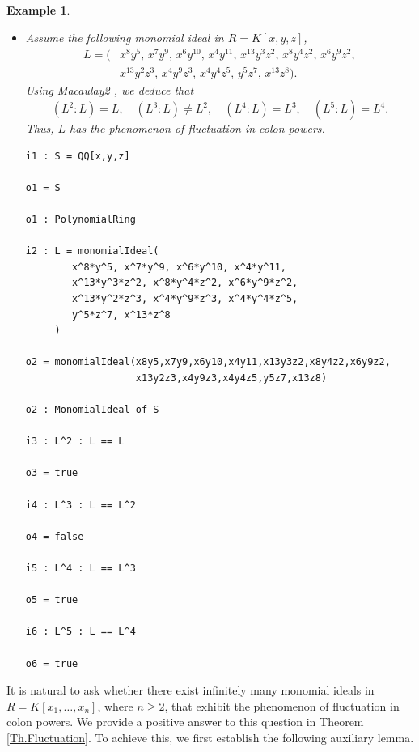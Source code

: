 \documentclass[11pt]{amsart}
\newtheorem{example}[theorem]{Example}
\begin{document}
\begin{example}
{\begin{itemize}
\begin{verbatim}
i6 : J^5 : J == J^4

o6 = true
\end{verbatim}
 
\item[(iii)]  Assume  the following monomial ideal in $R=K[x,y,z]$, 
\begin{align*}
L=(&x^{8}y^{5},\,x^{7}y^{9},\,x^{6}y^{10},\,x^{4}y^{11},\,x^{13}y^{3}z^{2},\,x^{8}y^{4}z^{2},\,x^{6}y^{9}z^{2},\\
& x^{13}y^{2}z^{3},\,x^{4}y^{9}z^{3},\,x^{4}y^{4}z^{5},\,y^{5}z^{7},\,x^{13}z^{8}).
\end{align*}
 Using  \textit{Macaulay2} \cite{GS}, we deduce that 
$$(L^2 : L) = L,\quad (L^3 : L) \neq L^2,  \quad  (L^4 : L) = L^3, \quad  (L^5: L) = L^4.$$
Thus, $L$ has the  phenomenon  of  fluctuation in colon powers.
\begin{verbatim}
i1 : S = QQ[x,y,z]

o1 = S

o1 : PolynomialRing

i2 : L = monomialIdeal(
        x^8*y^5, x^7*y^9, x^6*y^10, x^4*y^11,
        x^13*y^3*z^2, x^8*y^4*z^2, x^6*y^9*z^2,
        x^13*y^2*z^3, x^4*y^9*z^3, x^4*y^4*z^5,
        y^5*z^7, x^13*z^8
     )

o2 = monomialIdeal(x8y5,x7y9,x6y10,x4y11,x13y3z2,x8y4z2,x6y9z2,
                   x13y2z3,x4y9z3,x4y4z5,y5z7,x13z8)

o2 : MonomialIdeal of S

i3 : L^2 : L == L

o3 = true

i4 : L^3 : L == L^2

o4 = false

i5 : L^4 : L == L^3

o5 = true

i6 : L^5 : L == L^4

o6 = true
\end{verbatim}
\end{itemize}
}
\end{example}


It is natural to ask whether there exist infinitely many monomial ideals in $R=K[x_1, \ldots, x_n]$, where $n\geq 2$,  that exhibit the phenomenon of fluctuation in colon powers.
 We provide a positive answer to this question in Theorem \ref{Th.Fluctuation}. To achieve this,  we first establish the following auxiliary lemma.
\end{document}
